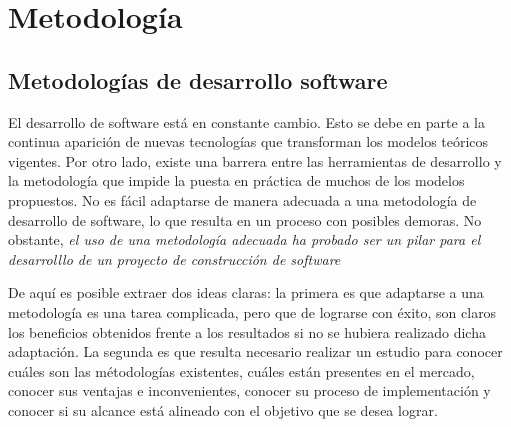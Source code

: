 

\section{Metodología} \label{Metodologia_Desarrollo}
\subsection{Metodologías de desarrollo software}
El desarrollo de software está en constante cambio. Esto se debe en parte a la continua aparición de nuevas tecnologías que 
transforman los modelos teóricos vigentes. Por otro lado, existe una barrera entre las herramientas de desarrollo y la 
metodología que impide la puesta en práctica de muchos de los modelos propuestos. No es fácil adaptarse de manera adecuada 
a una metodología de desarrollo de software, lo que resulta en un proceso con posibles demoras. No obstante, 
\textit{el uso de una metodología adecuada ha probado ser un pilar para el desarrolllo de un proyecto de construcción de software} \autocite*{Moyo} \medskip

De aquí es posible extraer dos ideas claras: la primera es que adaptarse a una metodología es una tarea complicada, 
pero que de lograrse con éxito, son claros los beneficios obtenidos frente a los resultados si no se hubiera 
realizado dicha adaptación. La segunda es que resulta necesario realizar un estudio para conocer 
cuáles son las métodologías existentes, cuáles están presentes en el mercado, conocer sus ventajas e inconvenientes, 
conocer su proceso de implementación y conocer si su alcance está alineado con el objetivo que se desea lograr. \medskip

